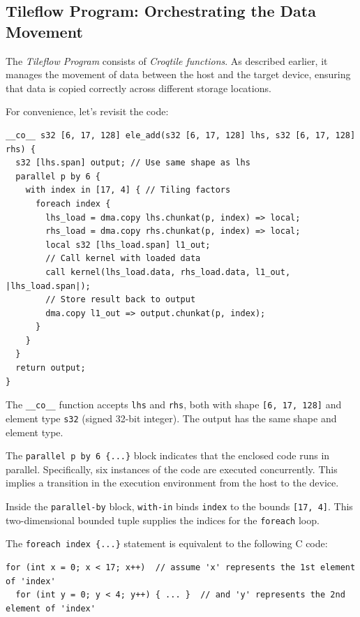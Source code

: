 \subsection*{Tileflow Program: Orchestrating the Data Movement}

The \emph{Tileflow Program} consists of \emph{Croqtile functions}. As described earlier, it manages the movement of data between the host and the target device, ensuring that data is copied correctly across different storage locations.

For convenience, let's revisit the code:

\begin{lstlisting}[language=croqtile,caption={The tileflow program}]
__co__ s32 [6, 17, 128] ele_add(s32 [6, 17, 128] lhs, s32 [6, 17, 128] rhs) {
  s32 [lhs.span] output; // Use same shape as lhs
  parallel p by 6 {
    with index in [17, 4] { // Tiling factors
      foreach index {
        lhs_load = dma.copy lhs.chunkat(p, index) => local;
        rhs_load = dma.copy rhs.chunkat(p, index) => local;
        local s32 [lhs_load.span] l1_out;
        // Call kernel with loaded data
        call kernel(lhs_load.data, rhs_load.data, l1_out, |lhs_load.span|);
        // Store result back to output
        dma.copy l1_out => output.chunkat(p, index);
      }
    }
  }
  return output;
}
\end{lstlisting}

The \texttt{\_\_co\_\_} function accepts \texttt{lhs} and \texttt{rhs}, both with shape \texttt{[6, 17, 128]} and element type \texttt{s32} (signed 32-bit integer). The output has the same shape and element type.

The \texttt{parallel p by 6 \{.\allowbreak{}.\allowbreak{}.\allowbreak{}\}} block indicates that the enclosed code runs in parallel. Specifically, six instances of the code are executed concurrently. This implies a transition in the execution environment from the host to the device.

Inside the \texttt{parallel-by} block, \texttt{with-in} binds \texttt{index} to the bounds \texttt{[17, 4]}. This two-dimensional bounded tuple supplies the indices for the \texttt{foreach} loop.

The \texttt{foreach index \{.\allowbreak{}.\allowbreak{}.\allowbreak{}\}} statement is equivalent to the following C code:

\begin{lstlisting}[language={},caption={The equivalent C++ loop}]
for (int x = 0; x < 17; x++)  // assume 'x' represents the 1st element of 'index'
  for (int y = 0; y < 4; y++) { ... }  // and 'y' represents the 2nd element of 'index'
\end{lstlisting}

